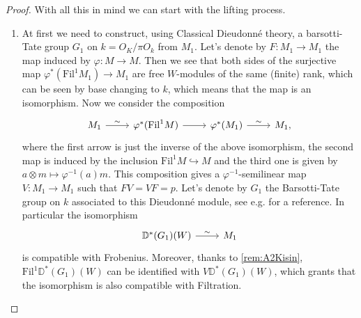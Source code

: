 \begin{proof}
With all this in mind we can start with the lifting process.
\begin{enumerate}
\item	At first we need to construct, using Classical Dieudonné theory,
	a barsotti-Tate group $G_1$ on $k = O_K/\pi O_k$ from $M_1$.
	Let's denote by $F\colon M_1 \to M_1$ the map induced by
	$\varphi\colon M \to M$.
	Then we see that both sides of the surjective map
	$\varphi^* ( \mathrm{Fil}^1 M_1) \to M_1$ are free $W$-modules of the same (finite) rank,
	which can be seen by base changing to $k$, which means that the map is an isomorphism.
	Now we consider the composition
	\begin{equation*}
	\begin{tikzcd}
		M_1 \arrow[r, "\sim", rightarrow] &
		\varphi^* (\mathrm{Fil}^1 M) \arrow[r, "", rightarrow] &
		\varphi^* (M_1) \arrow[r, "\sim", rightarrow] &
		M_1
	,\end{tikzcd}
	\end{equation*}
	where the first arrow is just the inverse of the above isomorphism, the second map
	is induced by the inclusion $\mathrm{Fil}^1 M \hookrightarrow M$ and the
	third one is given by $a \otimes m \mapsto \varphi^{-1}(a)m$.
	This composition gives a $\varphi^{-1}$-semilinear map $V\colon M_1 \to M_1$
	such that $FV = VF = p$.
	Let's denote by $G_1$ the Barsotti-Tate group on $k$ associated to this
	Dieudonné module, see e.g. \cite[Proposition 7.2.6]{Brinon} for a reference.
	In particular the isomorphism
	\begin{equation*}
	\begin{tikzcd}[row sep = 0ex
		,/tikz/column 1/.append style={anchor=base east}
		,/tikz/column 2/.append style={anchor=base west}]
		\mathbb{D}^*(G_1)(W) \arrow[r, "\sim", rightarrow] &
		M_1
	\end{tikzcd}
	\end{equation*} 
	is compatible with Frobenius.
	Moreover, thanks to \cref{rem:A2Kisin}, $\mathrm{Fil}^1 \mathbb{D}^*(G_1)(W)$
	can be identified with $V \mathbb{D}^*(G_1)(W)$, which grants that the isomorphism
	is also compatible with Filtration.


\end{enumerate}
\end{proof}
